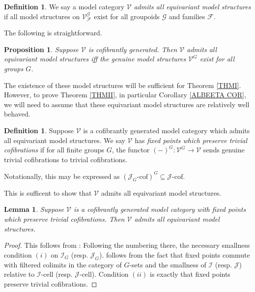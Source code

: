 \documentclass[a4paper,10pt
,draft
]{article}%
\numberwithin{equation}{section}
\numberwithin{figure}{section}
\newtheorem{lemma}[equation]{Lemma}%
\newtheorem{proposition}[equation]{Proposition}%
\theoremstyle{definition} %
\newtheorem{definition}[equation]{Definition}%
\DeclareMathOperator{\colim}{colim}%
\newcommand{\F}{\ensuremath{\mathcal F}}
\newcommand{\V}{\ensuremath{\mathcal V}}
\newcommand{\G}{\ensuremath{\mathcal G}}
\newcommand{\1}{\ensuremath{\mathbbm 1}}%
\begin{document}
\begin{definition}\label{ALLEQ DEF}
We say a model category $\V$ \emph{admits all equivariant model structures}
if all model structures on $\V^{\G}_{\F}$
exist for all groupoids $\G$ and families $\F$.
\end{definition}


The following is straightforward.
\begin{proposition}\label{ALLEQ PROP}
Suppose $\V$ is cofibrantly generated.
Then $\V$ admits all equivariant model structures iff
the genuine model structures $\V^G$
exist for all groups $G$.
\end{proposition}






The existence of these model structures will be sufficient for Theorem \ref{THMI}.
However, to prove Theorem \ref{THMII}, in particular Corollary \ref{ALBEETA COR}, we will need
to assume that these equivariant model structures are relatively well behaved.
\begin{definition}
      Suppose $\V$ is a cofibrantly generated model category which admits all equivariant model structures.
      We say $\V$ has \textit{fixed points which preserve trivial cofibrations} if
      for all finite groups $G$,
      the functor $(-)^G \colon \V^G \to \V$ sends genuine trivial cofibrations to trivial cofibrations.

      Notationally, this may be expressed as $\left(\mathcal J_G\text{-cof}\right)^G \subseteq \mathcal J\text{-cof}$.
\end{definition}


This is sufficent to show that $\V$ admits all equivariant model structures.
\begin{lemma}
      \label{PTRCOF_LEM}
      Suppose $\V$ is a cofibrantly generated model category with fixed points which preserve trivial cofibrations.
      Then $\V$ admits all equivariant model structures.
\end{lemma}
\begin{proof}
      This follows from \cite[Thm. A.1]{Ste16}:
      Following the numbering there,
      the necessary smallness condition $(i)$ on $\mathcal I_G$ (resp. $\mathcal J_G$).
      follows from the fact that
      fixed points commute with filtered colimits in the category of $G$-sets
      and the smallness of $\mathcal I$ (resp. $\mathcal J$) relative to $\mathcal I$-cell (resp. $\mathcal J$-cell).
      Condition $(ii)$ is exactly that fixed points preserve trivial cofibrations.
\end{proof}
\end{document}
